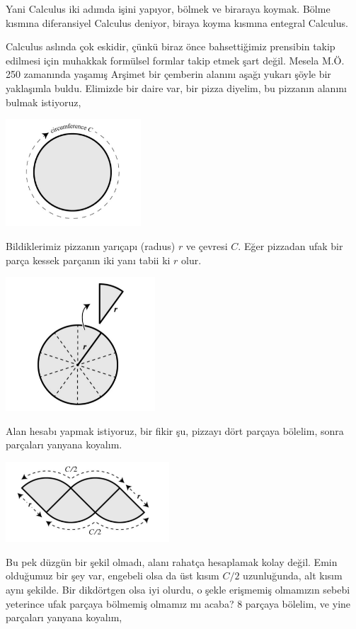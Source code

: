 \documentclass[12pt,fleqn]{article}\usepackage{../../common}
\begin{document}
Yani Calculus iki adımda işini yapıyor, bölmek ve biraraya koymak. Bölme
kısmına diferansiyel Calculus deniyor, biraya koyma kısmına entegral
Calculus.

Calculus aslında çok eskidir, çünkü biraz önce bahsettiğimiz prensibin
takip edilmesi için muhakkak formülsel formlar takip etmek şart
değil. Mesela M.Ö. 250 zamanında yaşamış Arşimet bir çemberin alanını aşağı
yukarı şöyle bir yaklaşımla buldu. Elimizde bir daire var, bir pizza
diyelim, bu pizzanın alanını bulmak istiyoruz,

\includegraphics[height=4cm]{circ_1.png}

Bildiklerimiz pizzanın yarıçapı (radıus) $r$ ve çevresi $C$. Eğer pizzadan
ufak bir parça kessek parçanın iki yanı tabii ki $r$ olur.

\includegraphics[height=5cm]{circ_2.png}

Alan hesabı yapmak istiyoruz, bir fikir şu, pizzayı dört parçaya bölelim,
sonra parçaları yanyana koyalım.

\includegraphics[height=3cm]{circ_3.png}

Bu pek düzgün bir şekil olmadı, alanı rahatça hesaplamak kolay değil. Emin
olduğumuz bir şey var, engebeli olsa da üst kısım $C/2$ uzunluğunda, alt
kısım aynı şekilde. Bir dikdörtgen olsa iyi olurdu, o şekle erişmemiş
olmamızın sebebi yeterince ufak parçaya bölmemiş olmamız mı acaba? 8
parçaya bölelim, ve yine parçaları yanyana koyalım,
\end{document}
